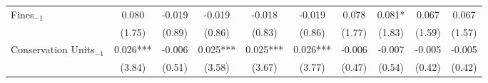 \begin{landscape}
\begin{table}[htpb!]
\begin{tabularx}{0.82\linewidth}{l C C C C C C C C C}
    Fines$_{-1}$ & 	0.080	&	-0.019	&	-0.019	&	-0.018	&	-0.019	&	0.078	&	0.081*	&	0.067	&	0.067	\\
                    & 	(1.75)	&	(0.89)	&	(0.86)	&	(0.83)	&	(0.86)	&	(1.77)	&	(1.83)	&	(1.59)	&	(1.57)	\\
    Conservation Units$_{-1}$ & 0.026***	&	-0.006	&	0.025***	&	0.025***	&	0.026***	&	-0.006	&	-0.007	&	-0.005	&	-0.005	\\
                    & 	(3.84)	&	(0.51)	&	(3.58)	&	(3.67)	&	(3.77)	&	(0.47)	&	(0.54)	&	(0.42)	&	(0.42)	\\

\end{tabularx}
\end{table}
\end{landscape}
